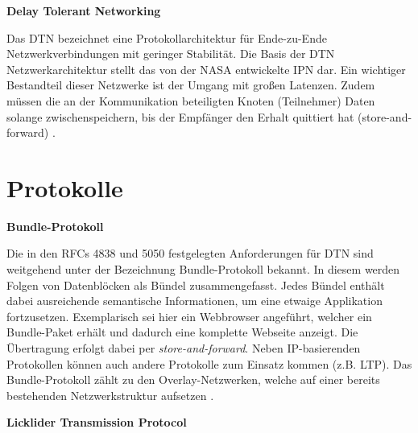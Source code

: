 \textbf{Delay Tolerant Networking}

Das \gls{DTN} bezeichnet eine Protokollarchitektur f{\"u}r
Ende-zu-Ende Netzwerkverbindungen mit geringer Stabilit{\"a}t. Die Basis der
\gls{DTN} Netzwerkarchitektur stellt das von der NASA entwickelte \gls{IPN} dar. Ein wichtiger
Bestandteil dieser Netzwerke ist der Umgang mit gro{\ss}en Latenzen. Zudem
m{\"u}ssen die an der Kommunikation beteiligten Knoten (Teilnehmer)
Daten solange zwischenspeichern, bis der Empf{\"a}nger den Erhalt quittiert hat
(store-and-forward) \cite{web3}.

\section{Protokolle}

\textbf{Bundle-Protokoll}

Die in den RFCs 4838 und 5050 festgelegten Anforderungen f{\"u}r \gls{DTN} sind
weitgehend unter der Bezeichnung Bundle-Protokoll bekannt. In diesem werden
Folgen von Datenbl{\"o}cken als B{\"u}ndel zusammengefasst. Jedes B{\"u}ndel enth{\"a}lt
dabei ausreichende semantische Informationen, um eine etwaige Applikation
fortzusetzen. Exemplarisch sei hier ein Webbrowser angef{\"u}hrt, welcher ein
Bundle-Paket erh{\"a}lt und dadurch eine komplette Webseite anzeigt.
Die {\"U}bertragung erfolgt dabei per \textit{store-and-forward}. Neben
IP-basierenden Protokollen k{\"o}nnen auch andere Protokolle zum Einsatz kommen
(z.B. \gls{LTP}). Das Bundle-Protokoll z{\"a}hlt zu den Overlay-Netzwerken, welche
auf einer bereits bestehenden Netzwerkstruktur aufsetzen \cite{web1}.

\textbf{Licklider Transmission Protocol}

